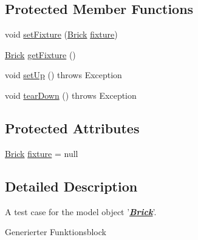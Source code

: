 \subsection*{Protected Member Functions}
\begin{DoxyCompactItemize}
\item 
void \hyperlink{classshootingmachineemfmodel_1_1tests_1_1_brick_test_af54114af16e4eddf3db171c9d32a42cc}{set\-Fixture} (\hyperlink{interfaceshootingmachineemfmodel_1_1_brick}{Brick} \hyperlink{classshootingmachineemfmodel_1_1tests_1_1_brick_test_a455802814ddec984a03abda399e07ee7}{fixture})
\item 
\hyperlink{interfaceshootingmachineemfmodel_1_1_brick}{Brick} \hyperlink{classshootingmachineemfmodel_1_1tests_1_1_brick_test_ab1fd810c925d922304ab3b6521e17518}{get\-Fixture} ()
\item 
void \hyperlink{classshootingmachineemfmodel_1_1tests_1_1_brick_test_aebdb8e54bb40af8456d17e7aa91c0aa9}{set\-Up} ()  throws Exception 
\item 
void \hyperlink{classshootingmachineemfmodel_1_1tests_1_1_brick_test_a5ab4e32b04df280009d9e95490976538}{tear\-Down} ()  throws Exception 
\end{DoxyCompactItemize}
\subsection*{Protected Attributes}
\begin{DoxyCompactItemize}
\item 
\hyperlink{interfaceshootingmachineemfmodel_1_1_brick}{Brick} \hyperlink{classshootingmachineemfmodel_1_1tests_1_1_brick_test_a455802814ddec984a03abda399e07ee7}{fixture} = null
\end{DoxyCompactItemize}


\subsection{Detailed Description}
A test case for the model object '{\itshape {\bfseries \hyperlink{interfaceshootingmachineemfmodel_1_1_brick}{Brick}}}'.

Generierter Funktionsblock 

